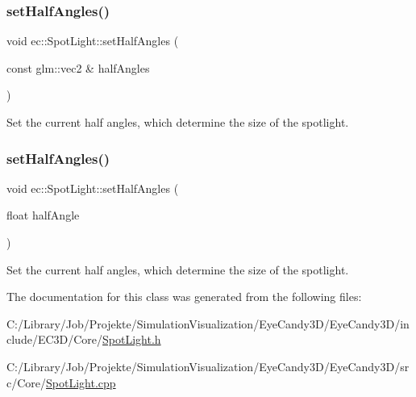 \subsubsection{\texorpdfstring{set\+Half\+Angles()}{setHalfAngles()}\hspace{0.1cm}{\footnotesize\ttfamily [1/2]}}
{\footnotesize\ttfamily void ec\+::\+Spot\+Light\+::set\+Half\+Angles (\begin{DoxyParamCaption}\item[{const glm\+::vec2 \&}]{half\+Angles }\end{DoxyParamCaption})}



Set the current half angles, which determine the size of the spotlight. 

\mbox{\label{classec_1_1_spot_light_a0b9a13abe376b5e0513f243036b41af9}} 
\subsubsection{\texorpdfstring{set\+Half\+Angles()}{setHalfAngles()}\hspace{0.1cm}{\footnotesize\ttfamily [2/2]}}
{\footnotesize\ttfamily void ec\+::\+Spot\+Light\+::set\+Half\+Angles (\begin{DoxyParamCaption}\item[{float}]{half\+Angle }\end{DoxyParamCaption})}



Set the current half angles, which determine the size of the spotlight. 



The documentation for this class was generated from the following files\+:\begin{DoxyCompactItemize}
\item 
C\+:/\+Library/\+Job/\+Projekte/\+Simulation\+Visualization/\+Eye\+Candy3\+D/\+Eye\+Candy3\+D/include/\+E\+C3\+D/\+Core/\mbox{\hyperlink{_spot_light_8h}{Spot\+Light.\+h}}\item 
C\+:/\+Library/\+Job/\+Projekte/\+Simulation\+Visualization/\+Eye\+Candy3\+D/\+Eye\+Candy3\+D/src/\+Core/\mbox{\hyperlink{_spot_light_8cpp}{Spot\+Light.\+cpp}}\end{DoxyCompactItemize}
